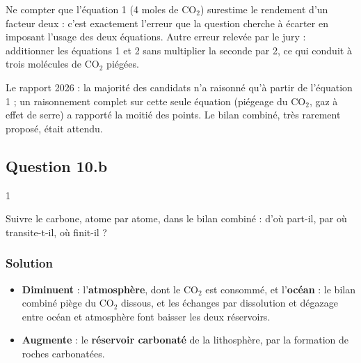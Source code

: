 \documentclass[11pt,a4paper]{article}
\providecommand{\tightlist}{\setlength{\itemsep}{0pt}\setlength{\parskip}{0pt}}
\begin{document}
\begin{piege}

Ne compter que l'équation 1 (4 moles de \(\mathrm{CO_2}\)) surestime le rendement d'un facteur deux : c'est exactement l'erreur que la question cherche à écarter en imposant l'usage des deux équations. Autre erreur relevée par le jury : additionner les équations 1 et 2 sans multiplier la seconde par 2, ce qui conduit à trois molécules de \(\mathrm{CO_2}\) piégées.

\end{piege}

\begin{jury}

Le rapport 2026 : la majorité des candidats n'a raisonné qu'à partir de l'équation 1 ; un raisonnement complet sur cette seule équation (piégeage du \(\mathrm{CO_2}\), gaz à effet de serre) a rapporté la moitié des points. Le bilan combiné, très rarement proposé, était attendu.

\end{jury}

\hypertarget{question-10.b}{%
\subsection{Question 10.b}\label{question-10.b}}

\begin{indication}{1}

Suivre le carbone, atome par atome, dans le bilan combiné : d'où part-il, par où transite-t-il, où finit-il ?

\end{indication}

\hypertarget{solution-31}{%
\subsubsection{Solution}\label{solution-31}}

\begin{itemize}
\tightlist
\item
  \textbf{Diminuent} : l'\textbf{atmosphère}, dont le \(\mathrm{CO_2}\) est consommé, et l'\textbf{océan} : le bilan combiné piège du \(\mathrm{CO_2}\) dissous, et les échanges par dissolution et dégazage entre océan et atmosphère font baisser les deux réservoirs.
\item
  \textbf{Augmente} : le \textbf{réservoir carbonaté} de la lithosphère, par la formation de roches carbonatées.
\end{itemize}
\end{document}

